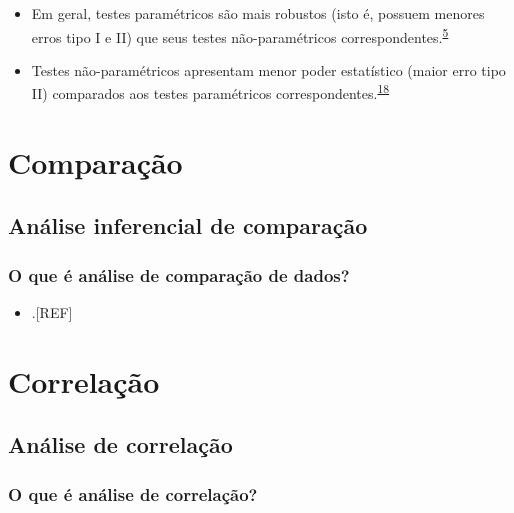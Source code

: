 \documentclass[
]{book}
\providecommand{\tightlist}{%
  \setlength{\itemsep}{0pt}\setlength{\parskip}{0pt}}
\begin{document}
\begin{itemize}
\item
  Em geral, testes paramétricos são mais robustos (isto é, possuem menores erros tipo I e II) que seus testes não-paramétricos correspondentes.\textsuperscript{\protect\hyperlink{ref-vetter2017}{5}}
\item
  Testes não-paramétricos apresentam menor poder estatístico (maior erro tipo II) comparados aos testes paramétricos correspondentes.\textsuperscript{\protect\hyperlink{ref-Ali2016}{18}}
\end{itemize}

\hypertarget{analise-comparacao}{%
\chapter{\texorpdfstring{\textbf{Comparação}}{Comparação}}\label{analise-comparacao}}

\hypertarget{analise-inferencial-comparacao}{%
\section{Análise inferencial de comparação}\label{analise-inferencial-comparacao}}

\hypertarget{o-que-uxe9-anuxe1lise-de-comparauxe7uxe3o-de-dados}{%
\subsection{O que é análise de comparação de dados?}\label{o-que-uxe9-anuxe1lise-de-comparauxe7uxe3o-de-dados}}

\begin{itemize}
\tightlist
\item
  .{[}REF{]}
\end{itemize}

\hypertarget{analise-inferencial-correlacao}{%
\chapter{\texorpdfstring{\textbf{Correlação}}{Correlação}}\label{analise-inferencial-correlacao}}

\hypertarget{analise-correlacao}{%
\section{Análise de correlação}\label{analise-correlacao}}

\hypertarget{o-que-uxe9-anuxe1lise-de-correlauxe7uxe3o}{%
\subsection{O que é análise de correlação?}\label{o-que-uxe9-anuxe1lise-de-correlauxe7uxe3o}}
\end{document}
